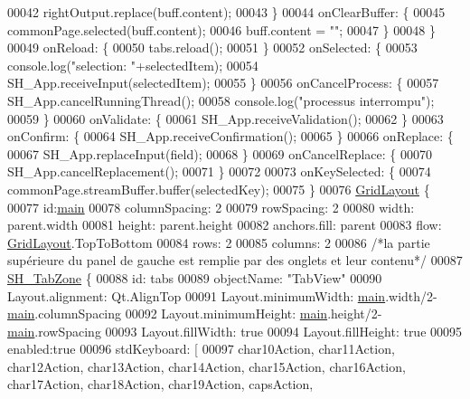 \begin{DoxyCode}
00042             rightOutput.replace(buff.content);
00043         \}
00044         onClearBuffer: \{
00045             commonPage.selected(buff.content);
00046             buff.content = \textcolor{stringliteral}{""};
00047         \}
00048     \}
00049     onReload: \{
00050         tabs.reload();
00051     \}
00052     onSelected: \{
00053         console.log(\textcolor{stringliteral}{"selection: "}+selectedItem);
00054         SH\_App.receiveInput(selectedItem);
00055     \}
00056     onCancelProcess: \{
00057         SH\_App.cancelRunningThread();
00058         console.log(\textcolor{stringliteral}{"processus interrompu"});
00059     \}
00060     onValidate: \{
00061         SH\_App.receiveValidation();
00062     \}
00063     onConfirm: \{
00064         SH\_App.receiveConfirmation();
00065     \}
00066     onReplace: \{
00067         SH\_App.replaceInput(field);
00068     \}
00069     onCancelReplace: \{
00070         SH\_App.cancelReplacement();
00071     \}
00072 
00073     onKeySelected: \{
00074         commonPage.streamBuffer.buffer(selectedKey);
00075     \}
00076     \hyperlink{classGridLayout}{GridLayout} \{
00077         \textcolor{keywordtype}{id}:\hyperlink{main_8cpp_a3c04138a5bfe5d72780bb7e82a18e627}{main}
00078         columnSpacing: 2
00079         rowSpacing: 2
00080         width: parent.width
00081         height: parent.height
00082         anchors.fill: parent
00083         flow: \hyperlink{classGridLayout}{GridLayout}.TopToBottom
00084         rows: 2
00085         columns: 2
00086         \textcolor{comment}{/*la partie supérieure du panel de gauche est remplie par des onglets et leur contenu*/}
00087         \hyperlink{classSH__TabZone}{SH\_TabZone} \{
00088             \textcolor{keywordtype}{id}: tabs
00089             objectName: \textcolor{stringliteral}{"TabView"}
00090             Layout.alignment: Qt.AlignTop
00091             Layout.minimumWidth: \hyperlink{main_8cpp_a3c04138a5bfe5d72780bb7e82a18e627}{main}.width/2-\hyperlink{main_8cpp_a3c04138a5bfe5d72780bb7e82a18e627}{main}.columnSpacing
00092             Layout.minimumHeight: \hyperlink{main_8cpp_a3c04138a5bfe5d72780bb7e82a18e627}{main}.height/2-\hyperlink{main_8cpp_a3c04138a5bfe5d72780bb7e82a18e627}{main}.rowSpacing
00093             Layout.fillWidth: \textcolor{keyword}{true}
00094             Layout.fillHeight: \textcolor{keyword}{true}
00095             enabled:\textcolor{keyword}{true}
00096             stdKeyboard: [
00097                 char10Action, char11Action, char12Action, char13Action, char14Action, char15Action, 
      char16Action, char17Action, char18Action, char19Action, capsAction,

\end{DoxyCode}
